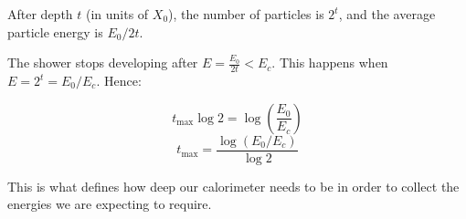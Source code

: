 After depth $t$ (in units of $X_0$), the number of particles is $2^t$, and the average particle energy is $E_0 / 2t$. 

The shower stops developing after $E = \frac{E_0}{2t} < E_c$. This happens when $E = 2^t = E_0/E_c$. Hence:

\[
    t_\text{max} \log 2 = \log \left(\frac{E_0}{E_c}\right)
\]
\[
    t_\text{max} = \frac{\log \left(E_0 / E_c\right)}{\log 2}
\]

This is what defines how deep our calorimeter needs to be in order to collect the energies we are expecting to require.